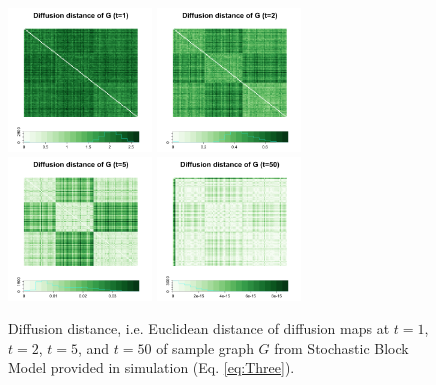 \documentclass[12pt]{article}
\theoremstyle{definition}
\begin{document}
\begin{figure}[H]
	\centering
	\label{fig:diffusions}
	\includegraphics[width=1.5in]{../Figure/Dx1.png}
	\includegraphics[width=1.5in]{../Figure/Dx2.png}
	\includegraphics[width=1.5in]{../Figure/Dx5.png}
	\includegraphics[width=1.5in]{../Figure/Dx50.png}
	\caption{Diffusion distance, i.e. Euclidean distance of diffusion maps at $t=1$, $t=2$, $t=5$, and $t=50$ of sample graph $G$ from Stochastic Block Model provided in simulation (Eq. \ref{eq:Three}).}
\end{figure}	
	
\end{document}
